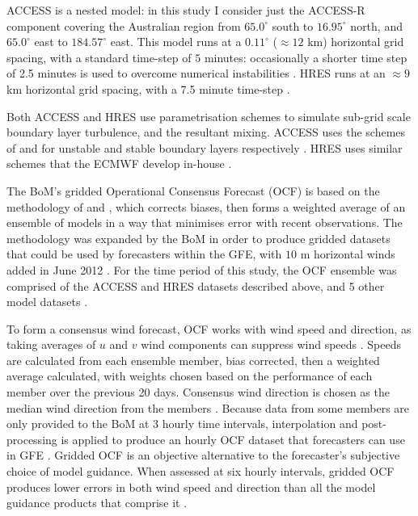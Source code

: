 \documentclass{ametsoc}
\begin{document}
ACCESS is a nested model: in this study I consider just the ACCESS-R component covering the Australian region from $65.0^\circ$ south to $16.95^\circ$ north, and $65.0^\circ$ east to $184.57^\circ$ east. This model runs at a $0.11^\circ$ ($\approx 12$ km) horizontal grid spacing, with a standard time-step of $5$ minutes: occasionally a shorter time step of 2.5 minutes is used to overcome numerical instabilities \citep{bom16}. HRES runs at an $\approx 9$ km horizontal grid spacing, with a 7.5 minute time-step \citep{ecmwf19c}. 

Both ACCESS and HRES use parametrisation schemes to simulate sub-grid scale boundary layer turbulence, and the resultant mixing. ACCESS uses the schemes of \citet{lock00} and \citet{louis79} for unstable and stable boundary layers respectively \citep{bom10}. HRES uses similar schemes that the ECMWF develop in-house \citep{ecmwf19a}.

The BoM's gridded Operational Consensus Forecast (OCF) is based on the methodology of \citet{woodcock05} and \citet{engel07}, which corrects biases, then forms a weighted average of an ensemble of models in a way that minimises error with recent observations. The methodology was expanded by the BoM in order to produce gridded datasets that could be used by forecasters within the GFE, with $10$ m horizontal winds added in June 2012 \citep{bom05, bom08, bom12}. For the time period of this study, the OCF ensemble was comprised of the ACCESS and HRES datasets described above, and 5 other model datasets  \citep{bom18}.

To form a consensus wind forecast, OCF works with wind speed and direction, as taking averages of $u$ and $v$ wind components can suppress wind speeds \citep{glahn72}. Speeds are calculated from each ensemble member, bias corrected, then a weighted average calculated, with weights chosen based on the performance of each member over the previous 20 days. Consensus wind direction is chosen as the median wind direction from the members \citep{bom12}. Because data from some members are only provided to the BoM at 3 hourly time intervals, interpolation and post-processing is applied to produce an hourly OCF dataset that forecasters can use in GFE \citep{bom08}. Gridded OCF is an objective alternative to the forecaster's subjective choice of model guidance. When assessed at six hourly intervals, gridded OCF produces lower errors in both wind speed and direction than all the model guidance products that comprise it \citep{bom12}.
\end{document}
